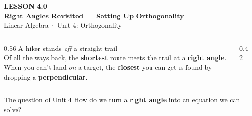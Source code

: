 \documentclass[aspectratio=169, 11pt]{beamer}
\begin{document}
{
\begin{frame}[plain]
  \vspace{2.8cm}\hspace{0.55cm}%
  \begin{minipage}{0.9\textwidth}
    {\color{goldacc}\bfseries\small LESSON 4.0}\\[0.5cm]
    {\color{white}\bfseries\LARGE Right Angles Revisited --- Setting Up Orthogonality}\\[1.0cm]
    {\color{blushmid}\small Linear Algebra~$\cdot$~Unit 4: Orthogonality}
  \end{minipage}
\end{frame}
}

\begin{frame}[t, plain]
  \begin{columns}[T]
    \begin{column}{0.56\textwidth}
      A hiker stands \emph{off} a straight trail.\\[6pt]
      Of all the ways back, the \textbf{shortest} route meets the trail at a \textbf{right angle}.\\[8pt]
      When you can't land \emph{on} a target, the \textbf{closest} you can get is found by dropping a
      \textbf{perpendicular}.
    \end{column}
    \begin{column}{0.42\textwidth}
      \centering
    \end{column}
  \end{columns}
  \vspace{4pt}
  \begin{block}{The question of Unit 4}
    How do we turn a \textbf{right angle} into an equation we can solve?
  \end{block}
\end{frame}
\end{document}
